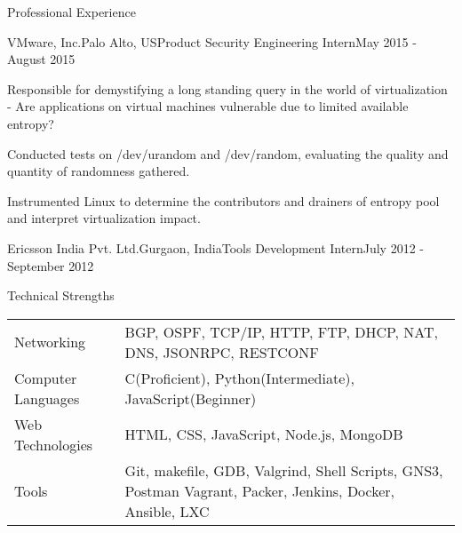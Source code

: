 \documentclass{resume} %
\begin{document}
\begin{rSection}{Professional Experience}
	\begin{rSubsectionEmployment}{VMware, Inc.}{Palo Alto, US}{Product Security Engineering Intern}{May 2015 - August 2015}
    	\item Responsible for demystifying a long standing query in the world of
    virtualization - Are applications on virtual machines vulnerable due to limited available entropy?
      	\item Conducted tests on /dev/urandom and /dev/random, evaluating the quality and quantity of randomness gathered.
        \item Instrumented Linux to determine the contributors and drainers of entropy pool and interpret virtualization impact.
	\end{rSubsectionEmployment}
	
    \begin{rSubsectionEmploymentSimple}{Ericsson India Pvt. Ltd.}{Gurgaon, India}{Tools Development Intern}{July 2012 - September 2012}
        \begin{comment}
        	\item Programmed tools for Excel, that compressed network statistics to a dashboard representation.
          	\item The automation saved the team from manual work and provided opportunity to improve and find new sales.   
        \end{comment}
   	\end{rSubsectionEmploymentSimple}
    
\end{rSection}


\begin{rSection}{Technical Strengths}
    \begin{tabularx}{\textwidth}{lX}%
        Networking & BGP, OSPF, TCP/IP, HTTP, FTP, DHCP, NAT, DNS, JSONRPC, RESTCONF\\ 
        Computer Languages & C(Proficient), Python(Intermediate), JavaScript(Beginner)\\
        Web Technologies & HTML, CSS, JavaScript, Node.js, MongoDB\\
        Tools & Git, makefile, GDB, Valgrind, Shell Scripts, GNS3, Postman \newline Vagrant, Packer, Jenkins, Docker, Ansible, LXC
    \end{tabularx}
\end{rSection}
\end{document}
